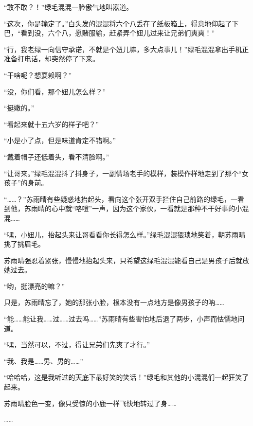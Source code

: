“敢不敢？！”绿毛混混一脸傲气地叫嚣道。

“这次，你是输定了。”白头发的混混将六个八丢在了纸板箱上，得意地仰起了下巴，“看到没，六个八，愿赌服输，赶紧弄个妞儿过来让兄弟们爽爽！”

“行，我老绿一向信守承诺，不就是个妞儿嘛，多大点事儿！”绿毛混混拿出手机正准备打电话，却突然停了下来。

“干啥呢？想耍赖啊？”

“没，你们看，那个妞儿怎么样？”

“挺嫩的。”

“看起来就十五六岁的样子吧？”

“小是小了点，但是味道肯定不错啊。”

“戴着帽子还低着头，看不清脸啊。”

“让哥来。”绿毛混混抖了抖身子，一副情场老手的模样，装模作样地走到了那个“女孩子”的身前。

“……？”苏雨晴有些疑惑地抬起头，看向这个张开双手拦住自己前路的绿毛，一看到他，苏雨晴的心中就“咯噔”一声，因为这个家伙，一看就是那种不干好事的小混混……

“嘿，小妞儿，抬起头来让哥看看你长得怎么样。”绿毛混混猥琐地笑着，朝苏雨晴挑了挑眉毛。

苏雨晴强忍着紧张，慢慢地抬起头来，只希望这绿毛混混能看自己是男孩子后就放她过去。

“哟，挺漂亮的嘛？”

只是，苏雨晴忘了，她的那张小脸，根本没有一点地方是像男孩子的呐……

“能……能让我……过……过去吗……”苏雨晴有些害怕地后退了两步，小声而怯懦地问道。

“嘿，当然可以，不过，得让兄弟们先爽了才行。”

“我、我是……男、男的……”

“哈哈哈，这是我听过的天底下最好笑的笑话！”绿毛和其他的小混混们一起狂笑了起来。

苏雨晴脸色一变，像只受惊的小鹿一样飞快地转过了身……

……
